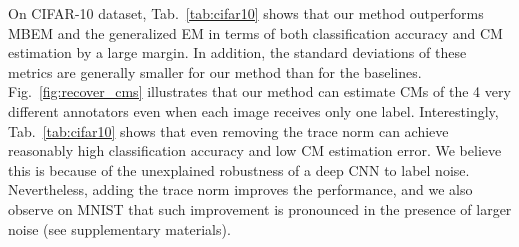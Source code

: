 On CIFAR-10 dataset, Tab.~\ref{tab:cifar10} shows that our method outperforms MBEM and the generalized EM in terms of both classification accuracy and CM estimation by a large margin. In addition, the standard deviations of these metrics are generally smaller for our method than for the baselines. Fig.~\ref{fig:recover_cms} illustrates that our method can estimate CMs of the 4 very different annotators even when each image receives only one label. Interestingly, Tab.~\ref{tab:cifar10} shows that even removing the trace norm can achieve reasonably high classification accuracy and low CM estimation error. We believe this is because of the unexplained robustness of a deep CNN to label noise. Nevertheless, adding the trace norm improves the performance, and we also observe on MNIST that such improvement is pronounced in the presence of larger noise (see supplementary materials).





